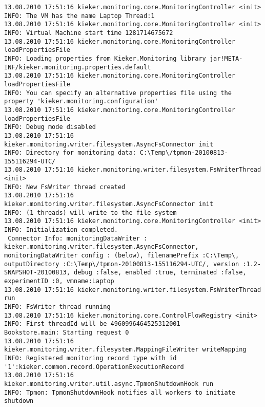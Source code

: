 \setBashListing
\begin{lstlisting}
13.08.2010 17:51:16 kieker.monitoring.core.MonitoringController <init>
INFO: The VM has the name Laptop Thread:1
13.08.2010 17:51:16 kieker.monitoring.core.MonitoringController <init>
INFO: Virtual Machine start time 1281714675672
13.08.2010 17:51:16 kieker.monitoring.core.MonitoringController loadPropertiesFile
INFO: Loading properties from Kieker.Monitoring library jar!META-INF/kieker.monitoring.properties.default
13.08.2010 17:51:16 kieker.monitoring.core.MonitoringController loadPropertiesFile
INFO: You can specify an alternative properties file using the property 'kieker.monitoring.configuration'
13.08.2010 17:51:16 kieker.monitoring.core.MonitoringController loadPropertiesFile
INFO: Debug mode disabled
13.08.2010 17:51:16 kieker.monitoring.writer.filesystem.AsyncFsConnector init
INFO: Directory for monitoring data: C:\Temp\/tpmon-20100813-155116294-UTC/
13.08.2010 17:51:16 kieker.monitoring.writer.filesystem.FsWriterThread <init>
INFO: New FsWriter thread created
13.08.2010 17:51:16 kieker.monitoring.writer.filesystem.AsyncFsConnector init
INFO: (1 threads) will write to the file system
13.08.2010 17:51:16 kieker.monitoring.core.MonitoringController <init>
INFO: Initialization completed.
 Connector Info: monitoringDataWriter : kieker.monitoring.writer.filesystem.AsyncFsConnector, monitoringDataWriter config : (below), filenamePrefix :C:\Temp\, outputDirectory :C:\Temp\/tpmon-20100813-155116294-UTC/, version :1.2-SNAPSHOT-20100813, debug :false, enabled :true, terminated :false, experimentID :0, vmname:Laptop
13.08.2010 17:51:16 kieker.monitoring.writer.filesystem.FsWriterThread run
INFO: FsWriter thread running
13.08.2010 17:51:16 kieker.monitoring.core.ControlFlowRegistry <init>
INFO: First threadId will be 4960996464525312001
Bookstore.main: Starting request 0
13.08.2010 17:51:16 kieker.monitoring.writer.filesystem.MappingFileWriter writeMapping
INFO: Registered monitoring record type with id '1':kieker.common.record.OperationExecutionRecord
13.08.2010 17:51:16 kieker.monitoring.writer.util.async.TpmonShutdownHook run
INFO: Tpmon: TpmonShutdownHook notifies all workers to initiate shutdown
\end{lstlisting}